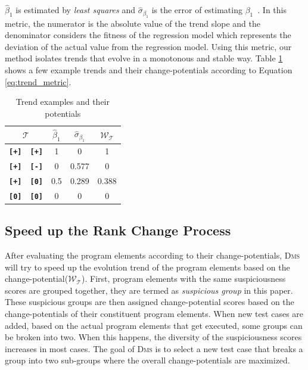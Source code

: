 $\hat{\beta}_{1}$ is estimated by {\em least squares} and $\hat{\sigma}_{\beta_{1}}$ is the error of estimating $\beta_{1}$~\citep{GrIy94}. In this metric, the numerator is the absolute value of the trend slope and the denominator considers the fitness of the regression model which represents the deviation of the actual value from the regression model.
Using this metric, our method isolates trends that evolve in a monotonous and stable way. Table \ref{tab:trend_exp} shows a few example trends and their change-potentials according to Equation \ref{eq:trend_metric}.

\begin{table}[!htbp]
	\centering
	\caption{Trend examples and their potentials}
		\renewcommand{\arraystretch}{1.5}
        \begin{tabular}{|cc|ccc|}
			\hline
			 \multicolumn{ 2}{|c|}{$\mathcal{T}$} &     $\hat{\beta}_{1}$ &      $\hat{\sigma}_{\beta_{1}}$ &  $\mathcal{W}_\mathcal{T}$ \\
			\hline\hline
			 {\bf \texttt{[+]}} &  {\bf \texttt{[+]}} &          1 &          0 &          1 \\
			\hline
			 {\bf \texttt{[+]}} &  {\bf \texttt{[-]}} &          0 &      0.577 &          0 \\
			\hline
			 {\bf \texttt{[+]}} &  {\bf \texttt{[0]}} &        0.5 &      0.289 &      0.388 \\
			\hline
			 {\bf \texttt{[0]}} &  {\bf \texttt{[0]}} &          0 &          0 &          0 \\
			\hline
		\end{tabular}
	\label{tab:trend_exp}
\end{table}

\subsection{Speed up the Rank Change Process}

After evaluating the program elements according to their change-potentials, \textsc{Dms} will try to speed up the evolution trend of the program elements based on the change-potential($\mathcal{W}_{\mathcal{T}}$). First, program elements with the same suspiciousness scores are grouped together, they are termed as {\em suspicious group} in this paper. These suspicious groups are then assigned change-potential scores based on the change-potentials of their constituent program elements. When new test cases are added, based on the actual program elements that get executed, some groups can be broken into two. When this happens, the diversity of the suspiciousness scores increases in most cases. The goal of \textsc{Dms} is to select a new test case that breaks a group into two sub-groups where the overall change-potentials are maximized.

